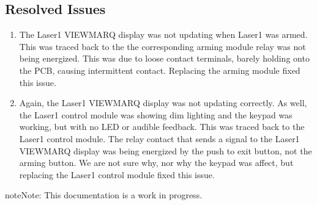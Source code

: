 \documentclass[letterpaper,10pt,english]{sphinxmanual}
\begin{document}
\subsection{Resolved Issues}
\label{\detokenize{troubleshooting_documentation/laser_safety_systems:resolved-issues}}\begin{enumerate}
%
\item {} 
\sphinxAtStartPar
The Laser\sphinxhyphen{}1 VIEWMARQ display was not updating when Laser\sphinxhyphen{}1 was armed.
This was traced back to the the corresponding arming module relay was not being energized.
This was due to loose contact terminals, barely holding onto the PCB, causing intermittent contact.
Replacing the arming module fixed this issue.

\item {} 
\sphinxAtStartPar
Again, the Laser\sphinxhyphen{}1 VIEWMARQ display was not updating correctly.
As well, the Laser\sphinxhyphen{}1 control module was showing dim lighting and the keypad was working, but with no LED or audible feedback.
This was traced back to the Laser\sphinxhyphen{}1 control module.
The relay contact that sends a signal to the Laser\sphinxhyphen{}1 VIEWMARQ display was being energized by the push to exit button, not the arming button.
We are not sure why, nor why the keypad was affect, but replacing the Laser\sphinxhyphen{}1 control module fixed this issue.

\end{enumerate}

\begin{sphinxadmonition}{note}{Note:}
\sphinxAtStartPar
This documentation is a work in progress.
\end{sphinxadmonition}



\renewcommand{\indexname}{Index}
\printindex
\end{document}
